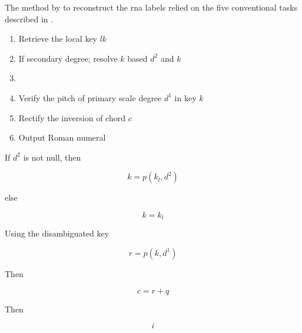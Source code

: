 
The method by \textcite{chen2018functional} to reconstruct
the \gls{rna} labels relied on the five conventional tasks
described in .

\begin{enumerate}
    \item Retrieve the local key $lk$
    \item If secondary degree; resolve $k$ based $d^2$ and $k$
    \item 
    \item Verify the pitch of primary scale degree $d^1$ in key $k$
    \item Rectify the inversion of chord $c$
    \item Output Roman numeral 
\end{enumerate}

If $d^2$ is not null, then

$$k = p(k_l, d^2)$$

else

$$k = k_l$$

Using the disambiguated key

$$r = p(k, d^1)$$

Then

$$c = r + q$$

Then

$$i$$
